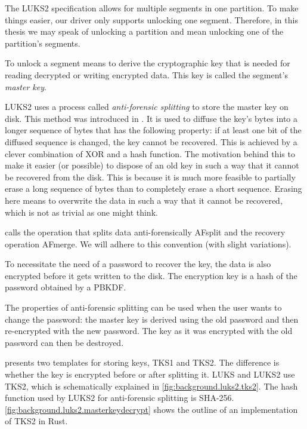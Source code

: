 The LUKS2 specification allows for multiple segments in one partition. To make things easier, our driver only supports unlocking one segment. Therefore, in this thesis we may speak of unlocking a partition and mean unlocking one of the partition's segments.

To unlock a segment means to derive the cryptographic key that is needed for reading decrypted or writing encrypted data. This key is called the segment's \emph{master key}.

LUKS2 uses a process called \emph{anti-forensic splitting} to store the master key on disk. This method was introduced in \cite{Fruhwirth2005}. It is used to diffuse the key's bytes into a longer sequence of bytes that has the following property: if at least one bit of the diffused sequence is changed, the key cannot be recovered. This is achieved by a clever combination of XOR and a hash function. The motivation behind this to make it easier (or possible) to dispose of an old key in such a way that it cannot be recovered from the disk. This is because it is much more feasible to partially erase a long sequence of bytes than to completely erase a short sequence. Erasing here means to overwrite the data in such a way that it cannot be recovered, which is not as trivial as one might think.

\cite{Fruhwirth2005} calls the operation that splits data anti-forensically AFsplit and the recovery operation AFmerge. We will adhere to this convention (with slight variations).

To necessitate the need of a password to recover the key, the data is also encrypted before it gets written to the disk. The encryption key is a hash of the password obtained by a PBKDF.

The properties of anti-forensic splitting can be used when the user wants to change the password: the master key is derived using the old password and then re-encrypted with the new password. The key as it was encrypted with the old password can then be destroyed.

\cite{Fruhwirth2005} presents two templates for storing keys, TKS1 and TKS2. The difference is whether the key is encrypted before or after splitting it. LUKS and LUKS2 use TKS2, which is schematically explained in \autoref{fig:background.luks2.tks2}. The hash function used by LUKS2 for anti-forensic splitting is SHA-256. \autoref{fig:background.luks2.masterkeydecrypt} shows the outline of an implementation of TKS2 in Rust.


